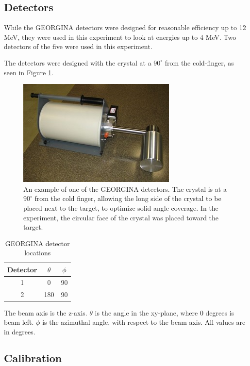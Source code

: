 \subsection{Detectors}

While the GEORGINA detectors were designed for reasonable efficiency up to 12 MeV, they were used in this experiment to look at energies up to 4 MeV. Two detectors of the five were used in this experiment. 

The detectors were designed with the crystal at a $90^{\circ}$ from the cold-finger, as seen in Figure \ref{fig:georgina}.

\begin{figure}
    \centering
    \includegraphics{Setup_Figs/georgina_example.png}
    \caption{An example of one of the GEORGINA detectors. The crystal is at a $90^{\circ}$ from the cold finger, allowing the long side of the crystal to be placed next to the target, to optimize solid angle coverage. In the experiment, the circular face of the crystal was placed toward the target.}
    \label{fig:georgina}
\end{figure}

\begin{table}[]
    \centering
    \caption{GEORGINA detector locations }
    \begin{tabular}{c|c|c} \toprule
         Detector & $\theta$ & $\phi$  \\
         \hline
         1 & 0 & 90 \\ 
         2 & 180 & 90\\ \bottomrule
    \end{tabular}
    \footnotesize
    \item The beam axis is the z-axis. $\theta$ is the angle in the xy-plane, where 0 degrees is beam left. $\phi$ is the azimuthal angle, with respect to the beam axis. All values are in degrees.
    \label{tab:GEORGE_Det_Loc}
\end{table}

\subsection{Calibration}

